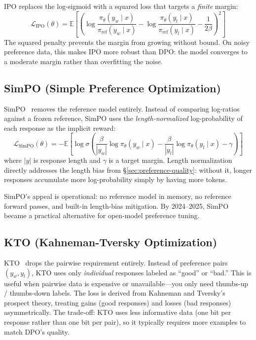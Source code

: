 IPO replaces the log-sigmoid with a squared loss that targets a \emph{finite} margin:
%
\[
\mathcal{L}_{\text{IPO}}(\theta) = \mathbb{E}\!\left[\left(\log \frac{\pi_\theta(y_w \mid x)}{\pi_{\text{ref}}(y_w \mid x)} - \log \frac{\pi_\theta(y_l \mid x)}{\pi_{\text{ref}}(y_l \mid x)} - \frac{1}{2\beta}\right)^{\!2}\right]
\]
%
The squared penalty prevents the margin from growing without bound. On noisy preference data, this makes IPO more robust than DPO: the model converges to a moderate margin rather than overfitting the noise.

\subsection{SimPO (Simple Preference Optimization)}

SimPO~\cite{meng2024simpo} removes the reference model entirely. Instead of comparing log-ratios against a frozen reference, SimPO uses the \emph{length-normalized} log-probability of each response as the implicit reward:
%
\[
\mathcal{L}_{\text{SimPO}}(\theta) = -\mathbb{E}\!\left[\log \sigma\!\left(\frac{\beta}{|y_w|} \log \pi_\theta(y_w \mid x) - \frac{\beta}{|y_l|} \log \pi_\theta(y_l \mid x) - \gamma\right)\right]
\]
%
where $|y|$ is response length and $\gamma$ is a target margin. Length normalization directly addresses the length bias from \S\ref{sec:preference-quality}: without it, longer responses accumulate more log-probability simply by having more tokens.

SimPO's appeal is operational: no reference model in memory, no reference forward passes, and built-in length-bias mitigation. By 2024--2025, SimPO became a practical alternative for open-model preference tuning.

\subsection{KTO (Kahneman-Tversky Optimization)}

KTO~\cite{ethayarajh2024kto} drops the pairwise requirement entirely. Instead of preference pairs $(y_w, y_l)$, KTO uses only \emph{individual} responses labeled as ``good'' or ``bad.'' This is useful when pairwise data is expensive or unavailable---you only need thumbs-up / thumbs-down labels. The loss is derived from Kahneman and Tversky's prospect theory, treating gains (good responses) and losses (bad responses) asymmetrically. The trade-off: KTO uses less informative data (one bit per response rather than one bit per pair), so it typically requires more examples to match DPO's quality.

